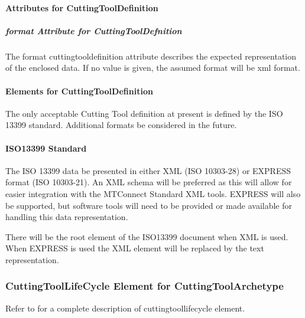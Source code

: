 \paragraph{Attributes for CuttingToolDefinition}\mbox{}



\subparagraph{format Attribute for CuttingToolDefnition}\mbox{}

The \gls{format cuttingtooldefinition} attribute describes the expected representation of the enclosed data. If no value is given, the assumed format will be \gls{xml format}. 

\clearpage



\paragraph{Elements for CuttingToolDefinition}\mbox{}

The only acceptable Cutting Tool definition at present is defined by the ISO 13399 standard.  Additional formats \MAY be considered in the future.

\paragraph{ISO13399 Standard}\mbox{}

The ISO 13399 data \MUST be presented in either XML (ISO 10303-28) or EXPRESS format (ISO 10303-21).  An XML schema will be preferred as this will allow for easier integration with the MTConnect Standard XML tools.  EXPRESS will also be supported, but software tools will need to be provided or made available for handling this data representation.

There will be the root element of the ISO13399 document when XML is used.  When EXPRESS is used the XML element will be replaced by the text representation.


\subsubsection{CuttingToolLifeCycle Element for CuttingToolArchetype}
Refer to  for a complete description of \gls{cuttingtoollifecycle} element.
